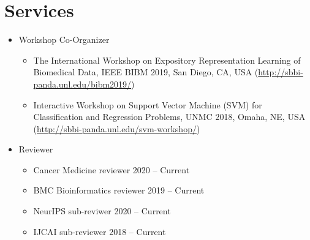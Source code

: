 \documentclass[a4paper,10pt]{article}
\begin{document}
\section{Services}
\begin{itemize}
  \item Workshop Co-Organizer
    \begin{itemize}
      \item The International Workshop on Expository Representation Learning of Biomedical Data, IEEE BIBM 2019, San Diego, CA, USA (\url{http://sbbi-panda.unl.edu/bibm2019/})
      \item Interactive Workshop on Support Vector Machine (SVM) for Classification and Regression Problems, UNMC 2018, Omaha, NE, USA (\url{http://sbbi-panda.unl.edu/svm-workshop/})
    \end{itemize}
  \item Reviewer
    \begin{itemize}
      \item Cancer Medicine reviewer \hfill 2020 -- Current
      \item BMC Bioinformatics reviewer \hfill 2019 -- Current
            \item NeurIPS sub-reviwer \hfill 2020 -- Current
      \item IJCAI sub-reviewer \hfill 2018 -- Current
    \end{itemize}
\end{itemize}

\newpage
\printbibliography[title={Publications}]
\end{document}
